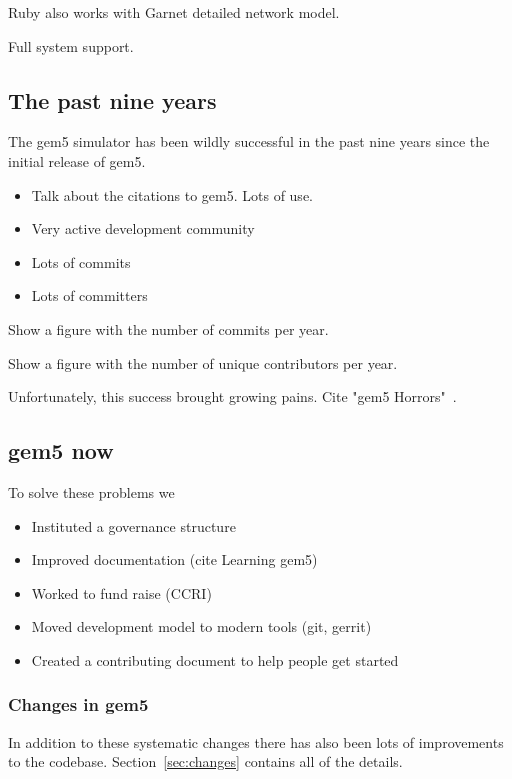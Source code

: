 Ruby also works with Garnet detailed network model.

Full system support.



\subsection{The past nine years}

The gem5 simulator has been wildly successful in the past nine years since the initial release of gem5.

\begin{itemize}
    \item Talk about the citations to gem5. Lots of use.
    \item Very active development community
    \item Lots of commits
    \item Lots of committers
\end{itemize}

Show a figure with the number of commits per year.

Show a figure with the number of unique contributors per year.

Unfortunately, this success brought growing pains.
Cite "gem5 Horrors"~\cite{Power-gem5horrors-2015}.

\subsection{gem5 now}

To solve these problems we
\begin{itemize}
    \item Instituted a governance structure
    \item Improved documentation (cite Learning gem5)
    \item Worked to fund raise (CCRI)
    \item Moved development model to modern tools (git, gerrit)
    \item Created a contributing document to help people get started
\end{itemize}

\subsubsection{Changes in gem5}

In addition to these systematic changes there has also been lots of improvements to the codebase.
Section~\ref{sec:changes} contains all of the details.

